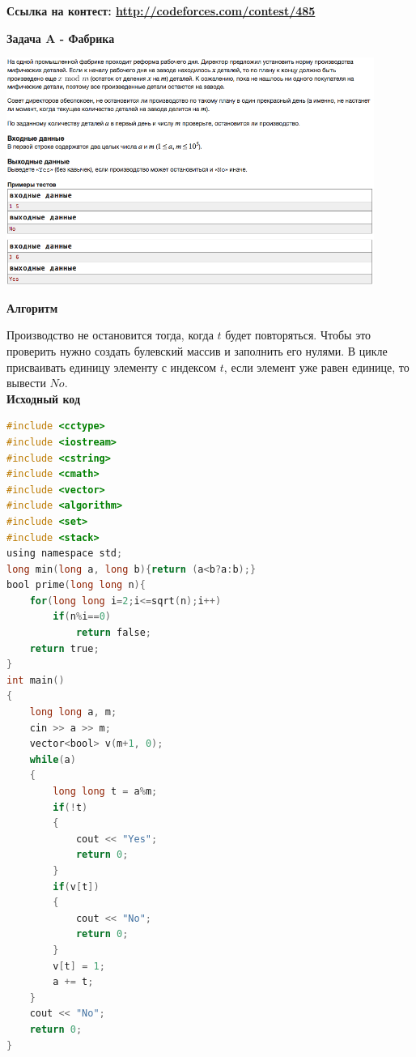 \documentclass[a4paper,12pt]{article}
\begin{document}
\textbf{{\large Ссылка на контест: \url{http://codeforces.com/contest/485}}}

\newpage
\textbf{{\large Задача A - Фабрика}} \\
\begin{center}
\includegraphics[width=0.9\textwidth]{C_276/C_276_A.png}\\ [1cm]
\end{center}

\newpage
\textbf{{\large Алгоритм}}

Производство не остановится тогда, когда $t$ будет повторяться. Чтобы это проверить нужно создать булевский массив и заполнить его нулями. В цикле присваивать единицу элементу с индексом $t$, если элемент уже равен единице, то вывести $No$.\\

\textbf{{\large Исходный код}} \\
\begin{lstlisting}[language=C]
#include <cctype>
#include <iostream>
#include <cstring>
#include <cmath>
#include <vector>
#include <algorithm>
#include <set>
#include <stack>
using namespace std;
long min(long a, long b){return (a<b?a:b);}
bool prime(long long n){
    for(long long i=2;i<=sqrt(n);i++)
        if(n%i==0)
            return false;
    return true;
}
int main()
{
    long long a, m;
    cin >> a >> m;
    vector<bool> v(m+1, 0);
    while(a)
    {
        long long t = a%m;
        if(!t)
        {
            cout << "Yes";
            return 0;
        }
        if(v[t])
        {
            cout << "No";
            return 0;
        }
        v[t] = 1;
        a += t;
    }
    cout << "No";
    return 0;
}
\end{lstlisting}
\end{document}
